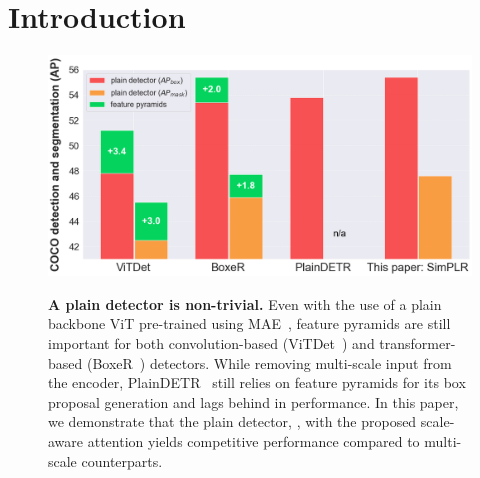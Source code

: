 
\section{Introduction}
\label{sec:introduction}

\begin{figure}[t]
    \centering
    {
        \includegraphics[width=\linewidth]{fig/fpn_comp.png}
    }
    \caption{
    \textbf{A plain detector is non-trivial.} Even with the use of a plain backbone ViT pre-trained using MAE~\cite{he2022mae}, feature pyramids are still important for both convolution-based (ViTDet~\cite{li2022vitdet}) and transformer-based (BoxeR~\cite{nguyen2022boxer}) detectors. While removing multi-scale input from the encoder, PlainDETR~\cite{lin2023plaindetr} still relies on feature pyramids for its box proposal generation and lags behind in performance. In this paper, we demonstrate that the plain detector, \ours, with the proposed scale-aware attention yields competitive performance compared to multi-scale counterparts. %
    }\label{fig:single_scale}
\end{figure}


